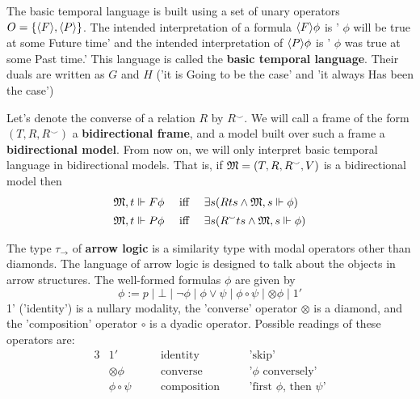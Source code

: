 \documentclass[11pt]{article}
\begin{document}
\begin{examplle}
The basic temporal language is built using a set of unary operators \(O=\{\langle
   F\rangle,\langle P\rangle\}\). The intended interpretation of a formula \(\langle F\rangle\phi\)
is ' \(\phi\) will be true at some Future time' and the intended interpretation of
\(\langle P\rangle\phi\) is ' \(\phi\) was true at some Past time.' This language is called
the \textbf{basic temporal language}. Their duals are written as \(G\) and \(H\) ('it
is Going to be the case' and 'it always Has been the case')

Let's denote the converse of a relation \(R\) by \(R^\smallsmile\). We will
call a frame of the form \((T,R,R^\smallsmile)\) a \textbf{bidirectional frame}, and a
model built over such a frame a \textbf{bidirectional model}. From now on, we will
only interpret basic temporal language in bidirectional models. That is, if
\(\mathfrak{M}=(T,R,R^\smallsmile,V)\) is a bidirectional model then
\begin{align*}
\mathfrak{M},t\Vdash F\phi \quad&\text{ iff }\quad
\exists s(Rts\wedge \mathfrak{M},s\Vdash\phi)\\
\mathfrak{M},t\Vdash P\phi \quad&\text{ iff }\quad
\exists s(R^\smallsmile ts\wedge \mathfrak{M},s\Vdash\phi)
\end{align*}
\end{examplle}

\begin{examplle}
The type \(\tau_\to\) of \textbf{arrow logic} is a similarity type with modal
operators other than diamonds. The language of arrow logic is designed to
talk about the objects in arrow structures. The well-formed formulas \(\phi\) are
given by
\begin{equation*}
\phi:=p\mid\bot\mid\neg\phi\mid\phi\vee\psi\mid\phi\circ\psi\mid
\otimes\phi\mid 1'
\end{equation*}
1' ('identity') is a nullary modality, the 'converse' operator \(\otimes\) is
a diamond, and the 'composition' operator \(\circ\) is a dyadic operator.
Possible readings of these operators are:
\begin{alignat*}{3}
&1'&&\text{identity}&&\text{'skip'}\\
&\otimes\phi&&\text{converse}&&\text{'\(\phi\) conversely'}\\
&\phi\circ\psi\quad&&\text{composition}\quad&&\text{'first \(\phi\), then \(\psi\)'}
\end{alignat*}
\end{examplle}
\end{document}
